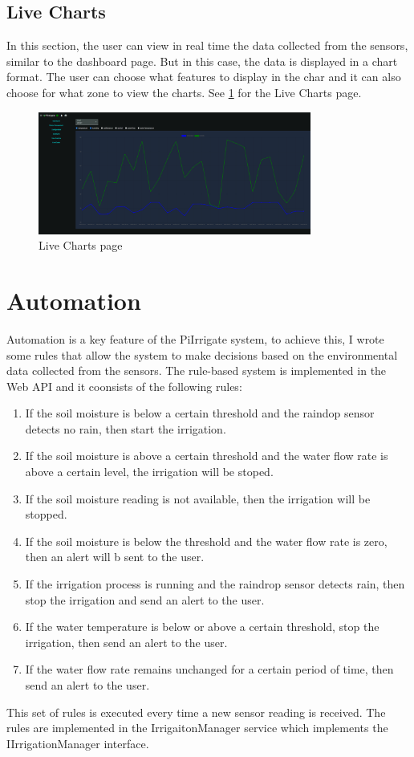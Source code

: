 \subsection{Live Charts}
In this section, the user can view in real time the data collected from the sensors, similar to the dashboard page. But in this case, the data is 
displayed in a chart format. The user can choose what features to display in the char and it can also choose for what zone to view the charts.
See \ref{fig:live-charts-page} for the Live Charts page.
\begin{figure}[H]
    \centering
    \includegraphics[width=0.8\textwidth]{images/live-charts.png}
    \caption{Live Charts page}
    \label{fig:live-charts-page}
\end{figure}


\section{Automation}
Automation is a key feature of the PiIrrigate system,
to achieve this, I wrote some rules that allow the system
to make decisions based on the environmental data collected from the sensors.
The rule-based system is implemented in the Web API and it coonsists
of the following rules:
\begin{enumerate}
    \item If the soil moisture is below a certain threshold and the raindop sensor detects no rain, then start the irrigation.
    \item If the soil moisture is above a certain threshold and the water flow rate is above a certain level, the irrigation will be stoped.
    \item If the soil moisture reading is not available, then the irrigation will be stopped.
    \item If the soil moisture is below the threshold and the water flow rate is zero, then an alert will b sent to the user.
    \item If the irrigation process is running and the raindrop sensor detects rain, then stop the irrigation and send an alert to the user.
    \item If the water temperature is below or above a certain threshold, stop the irrigation, then send an alert to the user.
    \item If the water flow rate remains unchanged for a certain period of time, then send an alert to the user.
\end{enumerate}
This set of rules is executed every time a new sensor reading is received.
The rules are implemented in the IrrigaitonManager service which implements the IIrrigationManager interface.                                                   

